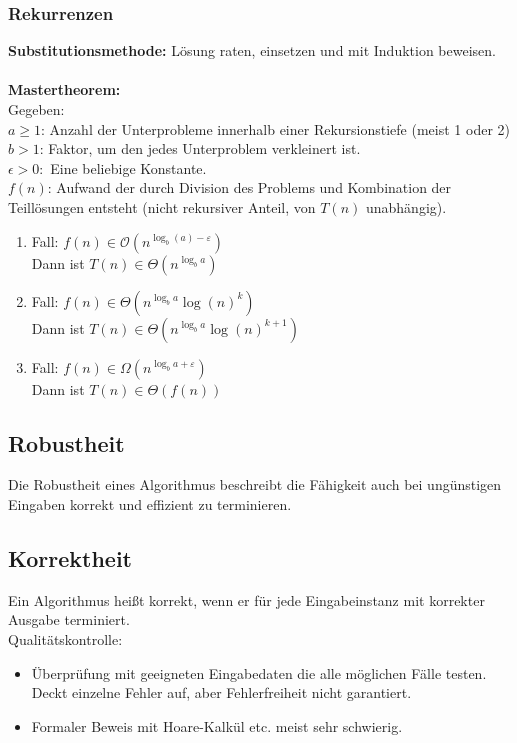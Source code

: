 \documentclass[fs, footer]{latex4ei}
\begin{document}
\begin{multicols*}{4}
\subsubsection{Rekurrenzen}
\textbf{Substitutionsmethode:} Lösung raten, einsetzen und mit Induktion beweisen.\\
\\
\textbf{Mastertheorem:}\\
Gegeben: \\ 
$a\ge1$: Anzahl der Unterprobleme innerhalb einer Rekursionstiefe (meist 1 oder 2) \\
$b>1$: Faktor, um den jedes Unterproblem verkleinert ist.\\
$\epsilon>0:$ Eine beliebige Konstante.\\
$f(n)$: Aufwand der durch Division des Problems und Kombination der Teillösungen entsteht (nicht rekursiver Anteil, von $T(n)$ unabhängig).\\
\begin{enumerate}
	\item Fall: $f(n) \in \mathcal{O}\left( n^{\log_b (a) - \varepsilon} \right)$\\
		Dann ist $T(n) \in \Theta\left( n^{\log_b a} \right)$
	\item Fall: $f(n) \in \Theta\left( n^{\log_b a}\log{(n)}^k \right)$\\
		Dann ist $T(n) \in \Theta\left( n^{\log_b a} \log(n)^{k+1}\right)$
	\item Fall: $f(n) \in \Omega\left( n^{\log_b a + \varepsilon} \right)$\\
		Dann ist $T(n) \in \Theta(f(n))$ 
\end{enumerate}
	\subsection{Robustheit}
	Die Robustheit eines Algorithmus beschreibt die Fähigkeit auch bei ungünstigen Eingaben korrekt und effizient zu terminieren. 
	\subsection{Korrektheit}
	Ein Algorithmus heißt korrekt, wenn er für jede Eingabeinstanz mit korrekter Ausgabe terminiert.\\
	Qualitätskontrolle:\\
	\begin{itemize}\itemsep0pt
		\item Überprüfung mit geeigneten Eingabedaten die alle möglichen Fälle testen. Deckt einzelne Fehler auf, aber Fehlerfreiheit nicht garantiert.\\
		\item Formaler Beweis mit Hoare-Kalkül etc. meist sehr schwierig.
	\end{itemize}


\end{multicols*}
\end{document}
